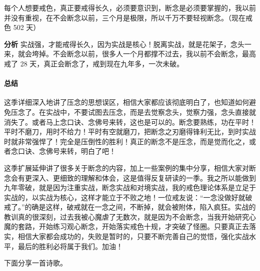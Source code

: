 \begin{case}
    每个人想要戒色，真正要戒得长久，必须要意识到，断念是必须要掌握的，我以前并没有重视，在不会断念以前，三个月是极限，所以千万不要轻视断念。（现在戒色 502 天）

    \textbf{分析} 实战强，才能戒得长久，因为实战是核心！脱离实战，就是花架子，念头一来，就会垮掉。不会断念以前，很多人一个月都撑不过去，我以前不会断念，最高戒了 28 天，真正会断念了，戒到现在九年多，一次未破。
\end{case}

\paragraph*{总结}

这季详细深入地讲了压念的思想误区，相信大家都应该彻底明白了，也知道如何避免压念了。在实战中，不要试图去压念，而是去觉察念头，觉察力强，念头直接就消失了。或者马上念口诀、念佛号来转，这也是可以的。断念要熟练，功在平时！平时不磨刀，用时不给力！平时有空就磨刀，把断念之刃磨得锋利无比，到时实战时就非常强悍了！完全是压倒性的胜利！真正的断念不是压念，而是觉而化之，或者念口诀、念佛号来转，明白了吧！

这季扩展延伸讲了很多关于断念的内容，加上一些案例的集中分享，相信大家对断念会有更深入、更细致的理解和体会，这是值得反复研读的一季。我之所以能做到九年零破，就是因为注重实战，断念实战和对境实战，我的戒色理论体系是立足于实战的，以实战为核心，这样才能立于不败之地！一位戒友说：“一念没做好就破戒了。”的确是这样，破戒就在一念之间，不断掉，就会被附体，陷入疯狂。实战的教训真的很深刻，过去我被心魔虐了无数次，就是因为不会断念，当我开始研究心魔的套路，开始练习观心断念，开始落实戒色十规，才突破了怪圈。只要真正去落实，相信大家都会成功的，失败是暂时的，只要不断完善自己的觉悟，强化实战水平，最后的胜利必将属于我们。加油！

下面分享一首诗歌。

